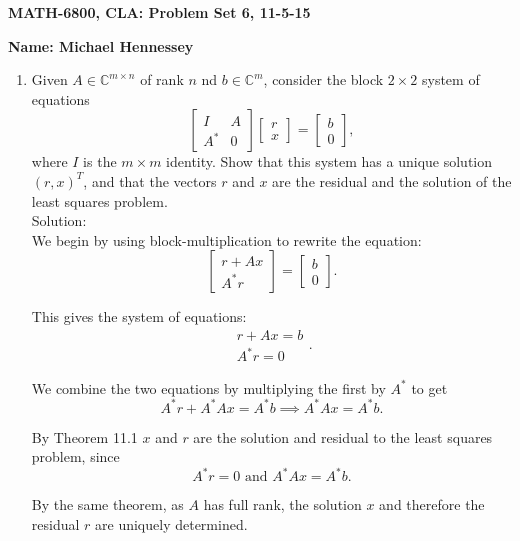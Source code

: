 \documentclass[12pt]{article}
\numberwithin{equation}{section}
\newcommand{\A}{\mathcal{A}}
\begin{document}
{\large\bf MATH-6800, CLA: Problem Set 6, 11-5-15}



\vspace{6 ex}

{\bf Name: Michael Hennessey} \hfill

\vspace{6 ex}

\begin{enumerate}
\item Given $A\in \mathbb{C}^{m\times n}$ of rank $n$ nd $b\in\mathbb{C}^m$, consider the block $2\times 2$ system of equations
    $$\left[\begin{array}{cc}I&A\\A^*&0\end{array}\right]\left[\begin{array}{c}r\\x\end{array}\right]=\left[\begin{array}{c}b\\0\end{array}\right],$$
    where $I$ is the $m\times m$ identity. Show that this system has a unique solution $(r,x)^T$, and that the vectors $r$ and $x$ are the residual and the solution of the least squares problem. \\

    Solution:\\

    We begin by using block-multiplication to rewrite the equation:
    $$\left[\begin{array}{c}r+Ax\\A^*r\end{array}\right]=\left[\begin{array}{c}b\\0\end{array}\right].$$

    This gives the system of equations:
    $$\begin{array}{c}r+Ax=b\\A^*r=0\end{array}.$$

    We combine the two equations by multiplying the first by $A^*$ to get
    $$A^*r+A^*Ax=A^*b\implies A^*Ax=A^*b.$$

    By Theorem 11.1 $x$ and $r$ are the solution and residual to the least squares problem, since
    $$A^*r=0\text{  and  }A^*Ax=A^*b.$$

    By the same theorem, as $A$ has full rank, the solution $x$ and therefore the residual $r$ are uniquely determined.


\end{enumerate}
\end{document}
